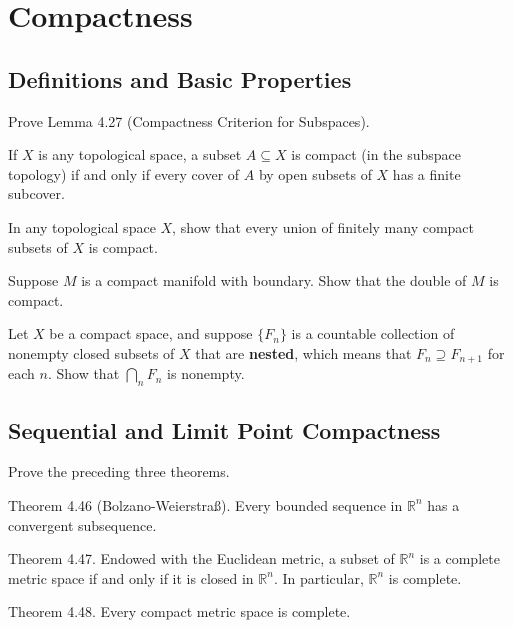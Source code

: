 \section*{Compactness}

\subsection*{Definitions and Basic Properties}

\begin{exercise}{4.28}
    Prove Lemma 4.27 (Compactness Criterion for Subspaces).

    If $X$ is any topological space, a subset $A\subseteq X$ is compact (in the subspace topology) if and only if every cover of $A$ by open subsets of $X$ has a finite subcover.
\end{exercise}

\begin{exercise}{4.29}
    In any topological space $X$, show that every union of finitely many compact subsets of $X$ is compact.
\end{exercise}

\begin{exercise}{4.37}
    Suppose $M$ is a compact manifold with boundary. Show that the double of $M$ is compact.
\end{exercise}

\begin{exercise}{4.38}
    Let $X$ be a compact space, and suppose $\{ F_{n} \}$ is a countable collection of nonempty closed subsets of $X$ that are \textbf{nested}, which means that $F_{n}\supseteq F_{n+1}$ for each $n$. Show that $\bigcap_{n}F_{n}$ is nonempty.
\end{exercise}

\subsection*{Sequential and Limit Point Compactness}

\begin{exercise}{4.49}
    Prove the preceding three theorems.

    Theorem 4.46 (Bolzano-Weierstraß). Every bounded sequence in $\mathbb{R}^{n}$ has a convergent subsequence.

    Theorem 4.47. Endowed with the Euclidean metric, a subset of $\mathbb{R}^{n}$ is a complete metric space if and only if it is closed in $\mathbb{R}^{n}$. In particular, $\mathbb{R}^{n}$ is complete.

    Theorem 4.48. Every compact metric space is complete.
\end{exercise}

